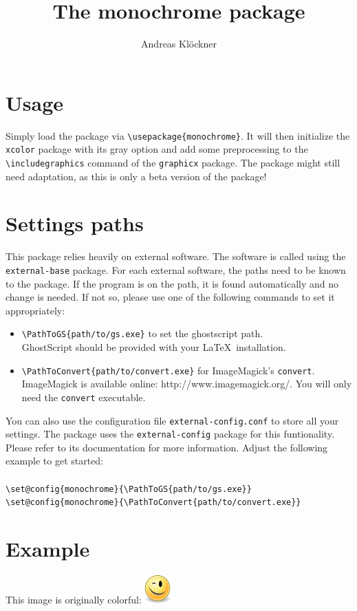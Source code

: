 \documentclass{article}
\title{The monochrome package}
\author{Andreas Kl\"ockner}
\begin{document}
  \maketitle

\section{Usage}
Simply load the package via \lstinline!\usepackage{monochrome}!. It will then initialize the \lstinline!xcolor! package with its gray option and add some preprocessing to the \lstinline!\includegraphics! command of the \lstinline!graphicx! package. The package might still need adaptation, as this is only a beta version of the package!

\section{Settings paths}
This package relies heavily on external software. The software is called using the \lstinline!external-base! package. For each external software, the paths need to be known to the package. If the program is on the path, it is found automatically and no change is needed. If not so, please use one of the following commands to set it appropriately:
\begin{itemize}
	\item \lstinline!\PathToGS{path/to/gs.exe}! to set the ghostscript path.\\
	      GhostScript should be provided with your \LaTeX~installation.
	\item \lstinline!\PathToConvert{path/to/convert.exe}! for ImageMagick's \lstinline!convert!.\\
	      ImageMagick is available online: http://www.imagemagick.org/. You will only need the \lstinline!convert! executable.
\end{itemize}

You can also use the configuration file \lstinline!external-config.conf! to store all your settings. The package uses the \lstinline!external-config! package for this funtionality. Please refer to its documentation for more information. Adjust the following example to get started:\\\\
\lstinline!\set@config{monochrome}{\PathToGS{path/to/gs.exe}}!\\
\lstinline!\set@config{monochrome}{\PathToConvert{path/to/convert.exe}}!


\section{Example}
This image is originally colorful: \includegraphics{monochrome_smiley.png}
\end{document}
